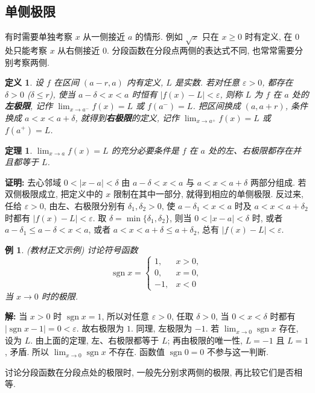 \documentclass[UTF8,openany]{ctexbook}
\theoremstyle{chinesetextbook}
\newtheorem{definition}{定义}[section]
\newtheorem{example}{例}[section]
\newtheorem{theorem}{定理}[section]
\newenvironment{cnproof}{\par\indent\textbf{证明:} \ignorespaces}{\par}
\newenvironment{cnsolution}{\par\indent\textbf{解:} \ignorespaces}{\par}
\begin{document}
\subsection{单侧极限}
有时需要单独考察 $x$ 从一侧接近 $a$ 的情形. 例如 $\sqrt x$ 只在 $x\ge0$ 时有定义, 在 $0$ 处只能考察 $x$ 从右侧接近 $0$. 分段函数在分段点两侧的表达式不同, 也常常需要分别考察两侧.
\begin{definition}
设 $f$ 在区间 $(a-r,a)$ 内有定义, $L$ 是实数. 若对任意 $\varepsilon>0$, 都存在 $\delta>0$ ($\delta\le r$), 使当 $a-\delta<x<a$ 时恒有 $|f(x)-L|<\varepsilon$, 则称 $L$ 为 $f$ 在 $a$ 处的\textbf{左极限}, 记作 $\displaystyle\lim_{x\to a^-}f(x)=L$ 或 $f(a^-)=L$. 把区间换成 $(a,a+r)$, 条件换成 $a<x<a+\delta$, 就得到\textbf{右极限}的定义, 记作 $\displaystyle\lim_{x\to a^+}f(x)=L$ 或 $f(a^+)=L$.
\end{definition}
\begin{theorem}
$\displaystyle\lim_{x\to a}f(x)=L$ 的充分必要条件是 $f$ 在 $a$ 处的左、右极限都存在并且都等于 $L$.
\end{theorem}
\begin{cnproof}
去心邻域 $0<|x-a|<\delta$ 由 $a-\delta<x<a$ 与 $a<x<a+\delta$ 两部分组成. 若双侧极限成立, 把定义中的 $x$ 限制在其中一部分, 就得到相应的单侧极限. 反过来, 任给 $\varepsilon>0$, 由左、右极限分别有 $\delta_1,\delta_2>0$, 使 $a-\delta_1<x<a$ 时及 $a<x<a+\delta_2$ 时都有 $|f(x)-L|<\varepsilon$. 取 $\delta=\min\{\delta_1,\delta_2\}$, 则当 $0<|x-a|<\delta$ 时, 或者 $a-\delta_1\le a-\delta<x<a$, 或者 $a<x<a+\delta\le a+\delta_2$, 总有 $|f(x)-L|<\varepsilon$.
\end{cnproof}
\begin{example}
\textnormal{(教材正文示例)} 讨论符号函数
\[
\operatorname{sgn}x=\begin{cases}1,&x>0,\\0,&x=0,\\-1,&x<0\end{cases}
\]
当 $x\to0$ 时的极限.
\end{example}
\begin{cnsolution}
当 $x>0$ 时 $\operatorname{sgn}x=1$, 所以对任意 $\varepsilon>0$, 任取 $\delta>0$, 当 $0<x<\delta$ 时都有 $|\operatorname{sgn}x-1|=0<\varepsilon$. 故右极限为 $1$. 同理, 左极限为 $-1$. 若 $\displaystyle\lim_{x\to0}\operatorname{sgn}x$ 存在, 设为 $L$. 由上面的定理, 左、右极限都等于 $L$; 再由极限的唯一性, $L=-1$ 且 $L=1$, 矛盾. 所以 $\displaystyle\lim_{x\to0}\operatorname{sgn}x$ 不存在. 函数值 $\operatorname{sgn}0=0$ 不参与这一判断.
\end{cnsolution}
讨论分段函数在分段点处的极限时, 一般先分别求两侧的极限, 再比较它们是否相等.
\end{document}
